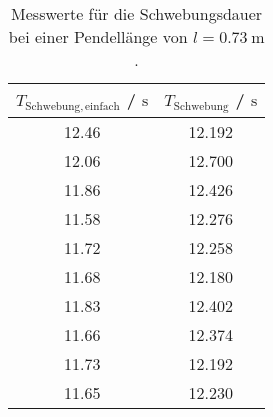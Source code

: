 \begin{table}
	\centering
	\caption{Messwerte für die Schwebungsdauer bei einer Pendellänge von $l=\SI{0.73}{\meter}$.}
	\label{tab:kalou}
	\begin{tabular}{cc}
		\toprule
		$T_{\mathrm{Schwebung,einfach}}$ / $\si{\second}$ & $T_{\mathrm{Schwebung}}$ / $\si{\second}$ \\
		\midrule
		12.46 & 12.192 \\
		12.06 & 12.700 \\
		11.86 & 12.426 \\
		11.58 & 12.276 \\
		11.72 & 12.258 \\
		11.68 & 12.180 \\
		11.83 & 12.402 \\
		11.66 & 12.374 \\
		11.73 & 12.192 \\
		11.65 & 12.230 \\
		\bottomrule
	\end{tabular}
\end{table}
